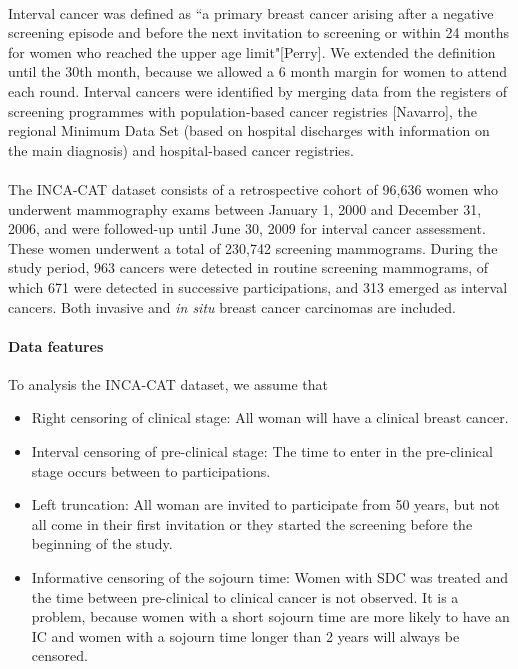 \documentclass[10pt,a4paper]{article}
\begin{document}
\paragraph{}Interval cancer was defined as ``a primary breast cancer arising after a negative
screening episode and before the next invitation to screening or within 24 months for women who
reached the upper age limit"[Perry]. We extended the definition until the 30th month, because we
allowed a 6 month margin for women to attend each round. Interval cancers were identified by
merging data from the registers of screening programmes with population-based cancer registries
[Navarro], the regional Minimum Data Set (based on hospital discharges with information on the main
diagnosis) and hospital-based cancer registries.

\paragraph{}The INCA-CAT dataset consists of a retrospective cohort of 96,636 women who underwent
mammography exams between January 1, 2000 and December 31, 2006, and were followed-up until June
30, 2009 for interval cancer assessment. These women underwent a total of 230,742 screening
mammograms. During the study period, 963 cancers were detected in routine screening mammograms, of
which 671 were detected in successive participations, and 313 emerged as interval cancers. Both
invasive and \textit{in situ} breast cancer carcinomas are included. 

\paragraph{Data features}To analysis the INCA-CAT dataset, we assume that
\begin{itemize}
\item Right censoring of clinical stage: All woman will have a clinical breast cancer.
\item Interval censoring of pre-clinical stage: The time to enter in the pre-clinical stage occurs
between to participations.
\item Left truncation: All woman are invited to participate from 50 years, but not all come in
their first invitation or they started the screening before the beginning of the study.
\item Informative censoring of the sojourn time: Women with SDC was treated and the time between
pre-clinical to clinical cancer is not observed. It is a problem, because women with a short
sojourn time are more likely to have an IC and women with a sojourn time longer than 2 years will
always be censored.
\end{itemize}
\end{document}
